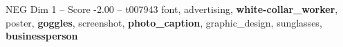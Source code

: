 \begin{textsample}{NEG Dim 1 – Score -2.00 – t007943}  \label{ex:f1_neg_013}
font, advertising, \textbf{white-collar\_worker}, poster, \textbf{goggles}, screenshot, \textbf{photo\_caption}, graphic\_design, sunglasses, \textbf{businessperson}

\end{textsample}
